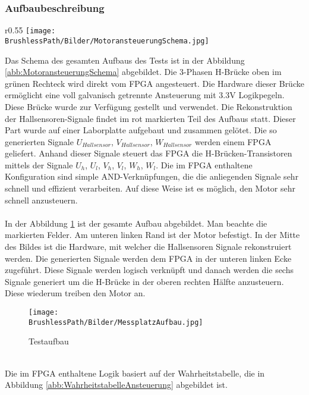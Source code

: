 \subsubsection{Aufbaubeschreibung}
    \BLDCcollab
    \begin{wrapfigure}{r}{0.55\textwidth}
       	\texttt{[image: \\BrushlessPath/Bilder/MotoransteuerungSchema.jpg]}
       	\centering
       	\caption{Schema des Brushless-Versuchsaufbaus}
        \label{abb:MotoransteuerungSchema}
    \end{wrapfigure}
    Das Schema des gesamten Aufbaus des Tests ist in der Abbildung 
    \ref{abb:MotoransteuerungSchema} abgebildet. Die 3-Phasen H-Brücke 
    oben im grünen Rechteck wird direkt vom FPGA angesteuert. Die Hardware 
    dieser Brücke ermöglicht eine voll galvanisch getrennte Ansteuerung 
    mit 3.3V Logikpegeln. Diese Brücke wurde zur Verfügung gestellt und 
    verwendet. Die Rekonstruktion der Hallsensoren-Signale findet im rot 
    markierten Teil des Aufbaus statt. Dieser Part wurde auf einer 
    Laborplatte aufgebaut und zusammen gelötet. Die so generierten Signale 
    $U_{Hallsensor}$, $V_{Hallsensor}$, $W_{Hallsensor}$ werden einem FPGA 
    geliefert. Anhand dieser Signale steuert das FPGA die 
    H-Brücken-Transistoren mittels der Signale $U_h$, $U_l$, $V_h$, $V_l$, 
    $W_h$, $W_l$. Die im FPGA enthaltene Konfiguration sind simple 
    AND-Verknüpfungen, die die anliegenden Signale sehr schnell und 
    effizient verarbeiten. Auf diese Weise ist es möglich, den Motor sehr 
    schnell anzusteuern.\\
    \\
    In der Abbildung \ref{abb:MessplatzAufbau} ist der gesamte Aufbau 
    abgebildet. Man beachte die markierten Felder. Am unteren linken Rand 
    ist der Motor befestigt. In der Mitte des Bildes ist die Hardware, mit 
    welcher die Hallsensoren Signale rekonstruiert werden. Die generierten 
    Signale werden dem FPGA in der unteren linken Ecke zugeführt. Diese 
    Signale werden logisch verknüpft und danach werden die sechs Signale 
    generiert um die H-Brücke in der oberen rechten Hälfte anzusteuern. 
    Diese wiederum treiben den Motor an.
    \begin{figure}[h!]
       	\texttt{[image: \\BrushlessPath/Bilder/MessplatzAufbau.jpg]}
       	\centering
       	\caption{Testaufbau} 
        \label{abb:MessplatzAufbau}
    \end{figure}\\
    Die im FPGA enthaltene Logik basiert auf der Wahrheitstabelle, die in 
    Abbildung \ref{abb:WahrheitstabelleAnsteuerung} abgebildet ist.
    
